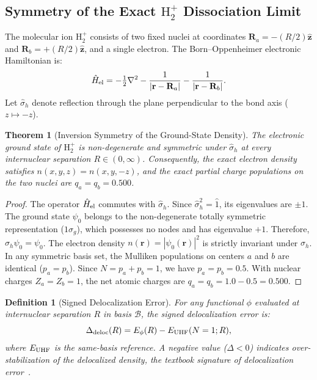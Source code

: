 \documentclass[journal]{IEEEtran}
\newtheorem{theorem}{Theorem}
\newtheorem{definition}{Definition}
\begin{document}
\subsection{Symmetry of the Exact $\text{H}_2^+$ Dissociation Limit}
The molecular ion $\text{H}_2^+$ consists of two fixed nuclei at coordinates $\mathbf R_a = -(R/2)\hat{\mathbf z}$ and $\mathbf R_b = +(R/2)\hat{\mathbf z}$, and a single electron. The Born--Oppenheimer electronic Hamiltonian is:
\begin{equation}
\hat H_{\rm el} = -\tfrac12 \nabla^2 - \frac{1}{|\mathbf r - \mathbf R_a|} - \frac{1}{|\mathbf r - \mathbf R_b|}.
\label{eq:h2plus_ham}
\end{equation}
Let $\hat\sigma_h$ denote reflection through the plane perpendicular to the bond axis ($z \mapsto -z$).

\begin{theorem}[Inversion Symmetry of the Ground-State Density]
\label{thm:h2_sym}
The electronic ground state of $\text{H}_2^+$ is non-degenerate and symmetric under $\hat\sigma_h$ at every internuclear separation $R \in (0, \infty)$. Consequently, the exact electron density satisfies $n(x,y,z) = n(x,y,-z)$, and the exact partial charge populations on the two nuclei are $q_a = q_b = 0.500$.
\end{theorem}
\begin{proof}
The operator $\hat H_{\rm el}$ commutes with $\hat\sigma_h$. Since $\hat\sigma_h^2 = \hat 1$, its eigenvalues are $\pm 1$. The ground state $\psi_0$ belongs to the non-degenerate totally symmetric representation ($1\sigma_g$), which possesses no nodes and has eigenvalue $+1$. Therefore, $\hat\sigma_h \psi_0 = \psi_0$. The electron density $n(\mathbf r) = |\psi_0(\mathbf r)|^2$ is strictly invariant under $\hat\sigma_h$. In any symmetric basis set, the Mulliken populations on centers $a$ and $b$ are identical ($p_a = p_b$). Since $N = p_a + p_b = 1$, we have $p_a = p_b = 0.5$. With nuclear charges $Z_a = Z_b = 1$, the net atomic charges are $q_a = q_b = 1.0 - 0.5 = 0.500$.
\end{proof}

\begin{definition}[Signed Delocalization Error]
For any functional $\phi$ evaluated at internuclear separation $R$ in basis $\mathcal{B}$, the signed delocalization error is:
\begin{equation}
\Delta_{\rm deloc}(R) = E_{\phi}(R) - E_{\rm UHF}(N=1; R),
\label{eq:deloc_error}
\end{equation}
where $E_{\rm UHF}$ is the same-basis reference. A negative value ($\Delta < 0$) indicates over-stabilization of the delocalized density, the textbook signature of delocalization error~\cite{CMSY2008}.
\end{definition}
\end{document}
